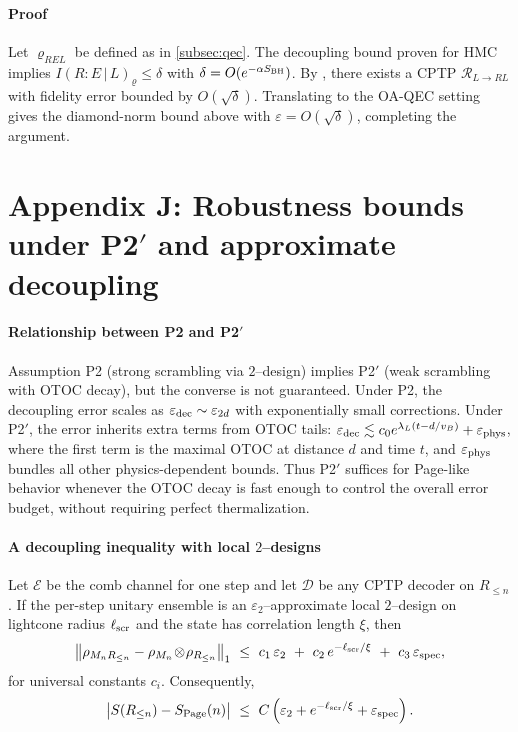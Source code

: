\documentclass[a4paper,11pt]{article}
\newcommand{\HMC}{\textsc{HMC}\xspace}
\theoremstyle{plain}
\theoremstyle{definition}
\theoremstyle{remark}
\begin{document}
\paragraph{Proof}
Let $\varrho_{REL}$ be defined as in \cref{subsec:qec}.
The decoupling bound proven for \HMC{} implies $I(R{:}E\,|\,L)_{\varrho}\le \delta$ with $\delta=O(e^{-\alpha S_{\rm BH}})$.
By \citet{FawziRenner:2015}, there exists a CPTP $\mathcal{R}_{L\to RL}$ with fidelity error bounded by $O(\sqrt{\delta})$.
Translating to the OA-QEC setting gives the diamond-norm bound above with $\varepsilon=O(\sqrt{\delta})$, completing the argument.

\section{Appendix J: Robustness bounds under \texorpdfstring{P2$'$}{P2'} and approximate decoupling}
\label{app:robustness}

\paragraph{Relationship between P2 and \texorpdfstring{P2$'$}{P2'}}
Assumption P2 (strong scrambling via $2$--design) implies P2$'$ (weak scrambling with OTOC decay), but the converse is not guaranteed. Under P2, the decoupling error scales as $\varepsilon_{\rm dec} \sim \varepsilon_{2d}$ with exponentially small corrections. Under P2$'$, the error inherits extra terms from OTOC tails: $\varepsilon_{\rm dec} \lesssim c_0 e^{\lambda_L(t - d/v_B)} + \varepsilon_{\rm phys}$, where the first term is the maximal OTOC at distance $d$ and time $t$, and $\varepsilon_{\rm phys}$ bundles all other physics-dependent bounds. Thus P2$'$ suffices for Page-like behavior whenever the OTOC decay is fast enough to control the overall error budget, without requiring perfect thermalization.

\paragraph{A decoupling inequality with local \texorpdfstring{$2$}{2}--designs}
Let $\mathcal{E}$ be the comb channel for one step and let $\mathcal{D}$ be any CPTP decoder on $R_{\le n}$. If the per-step unitary ensemble is an $\varepsilon_2$--approximate local $2$--design on lightcone radius $\ell_{\rm scr}$ and the state has correlation length $\xi$, then
\begin{equation}
\left\| \rho_{M_n R_{\le n}} - \rho_{M_n}\!\otimes\!\rho_{R_{\le n}} \right\|_1 \ \le\ c_1\,\varepsilon_2\ +\ c_2\,e^{-\ell_{\rm scr}/\xi}\ +\ c_3\,\varepsilon_{\rm spec},
\end{equation}
for universal constants $c_i$. Consequently,
\begin{equation}
\big| S(R_{\le n}) - S_{\rm Page}(n) \big| \ \le\ C\left(\varepsilon_2 + e^{-\ell_{\rm scr}/\xi} + \varepsilon_{\rm spec}\right).
\end{equation}
\end{document}
